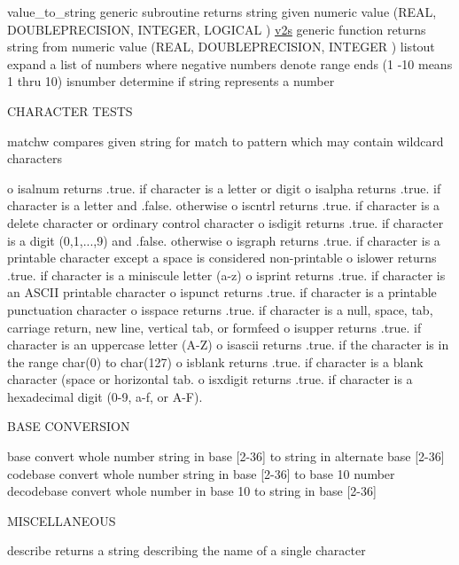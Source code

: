 value\+\_\+to\+\_\+string generic subroutine returns string given numeric value (R\+E\+AL, D\+O\+U\+B\+L\+E\+P\+R\+E\+C\+I\+S\+I\+ON, I\+N\+T\+E\+G\+ER, L\+O\+G\+I\+C\+AL ) \mbox{\hyperlink{interfacem__strings_1_1v2s}{v2s}} generic function returns string from numeric value (R\+E\+AL, D\+O\+U\+B\+L\+E\+P\+R\+E\+C\+I\+S\+I\+ON, I\+N\+T\+E\+G\+ER ) listout expand a list of numbers where negative numbers denote range ends (1 -\/10 means 1 thru 10) isnumber determine if string represents a number

C\+H\+A\+R\+A\+C\+T\+ER T\+E\+S\+TS

matchw compares given string for match to pattern which may contain wildcard characters

o isalnum returns .true. if character is a letter or digit o isalpha returns .true. if character is a letter and .false. otherwise o iscntrl returns .true. if character is a delete character or ordinary control character o isdigit returns .true. if character is a digit (0,1,...,9) and .false. otherwise o isgraph returns .true. if character is a printable character except a space is considered non-\/printable o islower returns .true. if character is a miniscule letter (a-\/z) o isprint returns .true. if character is an A\+S\+C\+II printable character o ispunct returns .true. if character is a printable punctuation character o isspace returns .true. if character is a null, space, tab, carriage return, new line, vertical tab, or formfeed o isupper returns .true. if character is an uppercase letter (A-\/Z) o isascii returns .true. if the character is in the range char(0) to char(127) o isblank returns .true. if character is a blank character (space or horizontal tab. o isxdigit returns .true. if character is a hexadecimal digit (0-\/9, a-\/f, or A-\/F).

B\+A\+SE C\+O\+N\+V\+E\+R\+S\+I\+ON

base convert whole number string in base \mbox{[}2-\/36\mbox{]} to string in alternate base \mbox{[}2-\/36\mbox{]} codebase convert whole number string in base \mbox{[}2-\/36\mbox{]} to base 10 number decodebase convert whole number in base 10 to string in base \mbox{[}2-\/36\mbox{]}

M\+I\+S\+C\+E\+L\+L\+A\+N\+E\+O\+US

describe returns a string describing the name of a single character

